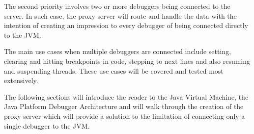 \documentclass[..thesis.tex]{subfiles}
\begin{document}
The second priority involves two or more debuggers being connected to the server. 
In such case, the proxy server will route and handle the data with the intention of creating an impression to every debugger of being connected directly to the JVM.

The main use cases when multiple debuggers are connected include setting, clearing and hitting breakpoints in code, stepping to next lines and also resuming and suspending threads.
These use cases will be covered and tested most extensively.

The following sections will introduce the reader to the Java Virtual Machine, the Java Platform Debugger Architecture and will walk through the creation of the proxy server which will provide a solution to the limitation of connecting only a single debugger to the JVM.
\end{document}
